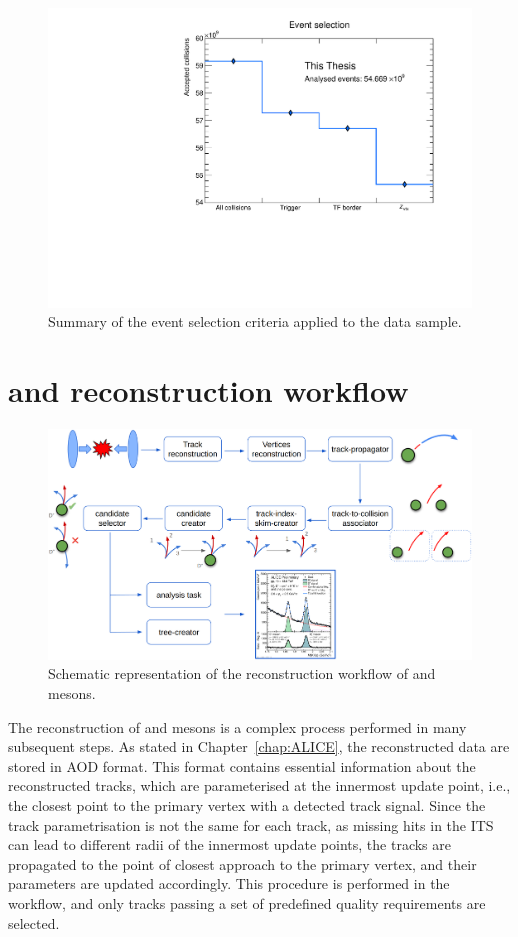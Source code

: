 \begin{figure}[htb]
    \centering
    \includegraphics[width=0.7\linewidth]{Figures/Chapter 4/EventSelection.pdf}
    \caption{Summary of the event selection criteria applied to the data sample.}
    \label{fig:EvSel}
\end{figure}

\section{\texorpdfstring{\ds and \dpl reconstruction workflow}{Ds+ and D+ reconstruction workflow}}
\begin{figure}
    \centering
    \includegraphics[width=\linewidth]{Figures/Chapter 4/Workflow_Scheme.png}
    \caption{Schematic representation of the reconstruction workflow of \ds and \dpl mesons.}
    \label{fig:RecoWorkflow}
\end{figure}
The reconstruction of \ds and \dpl mesons is a complex process performed in many subsequent steps. As stated in Chapter~\ref{chap:ALICE}, the reconstructed data are stored in AOD format. This format contains essential information about the reconstructed tracks, which are parameterised at the innermost update point, i.e., the closest point to the primary vertex with a detected track signal. Since the track parametrisation is not the same for each track, as missing hits in the ITS can lead to different radii of the innermost update points, the tracks are propagated to the point of closest approach to the primary vertex, and their parameters are updated accordingly. This procedure is performed in the  workflow, and only tracks passing a set of predefined quality requirements are selected. 

